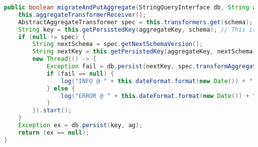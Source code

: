 \begin{lstlisting}[language=Java, caption={Metode for håndtering av PUT-spørringer i Migrator.}]
public boolean migrateAndPutAggregate(StringQueryInterface db, String aggregateKey, String schema, String ag) {
    this.aggregateTransformerReceiver();
    AbstractAggregateTransformer spec = this.transformers.get(schema);
    String key = this.getPersistedKey(aggregateKey, schema); // This is the key used by the application
    if (null != spec) {
        String nextSchema = spec.getNextSchemaVersion();
        String nextKey = this.getPersistedKey(aggregateKey, nextSchema);
        new Thread(() -> {
            Exception fail = db.persist(nextKey, spec.transformAggregate(ag));
            if (fail == null) {
                log("INFO @ " + this.dateFormat.format(new Date()) + " - Migrated aggregate with key " + key + " to " + nextKey + "\n");
            } else {
                log("ERROR @ " + this.dateFormat.format(new Date()) + " - Error during persisting " + nextKey + "\n" + fail.toString() + "\n");
            }
        }).start();
    }
    Exception ex = db.persist(key, ag);
    return (ex == null);
}
\end{lstlisting}
